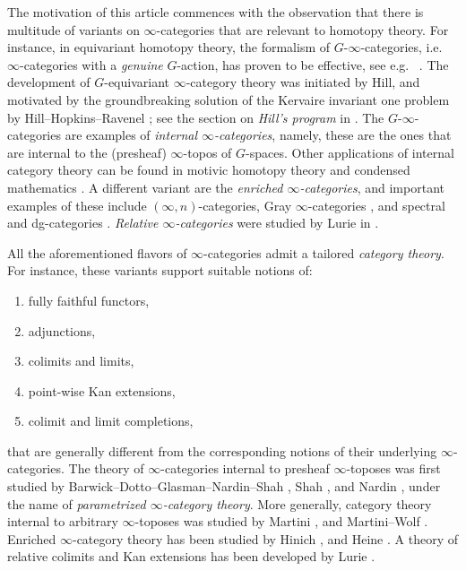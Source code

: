 \documentclass[a4paper, 11pt]{amsart}
\numberwithin{theorem}{section}
\theoremstyle{definition}
\begin{document}
The motivation of this article commences with the observation that there is multitude of variants on $\infty$-categories that are relevant to homotopy theory. 
For instance, in equivariant homotopy theory, the formalism of $G$-$\infty$-categories, i.e.\ $\infty$-categories with a \textit{genuine} $G$-action, 
has proven to be effective, see e.g.\ \cite{EquivThom} \cite{Hilman}. The development of 
$G$-equivariant $\infty$-category theory was initiated by Hill, and motivated by the groundbreaking solution of the Kervaire invariant one problem by Hill--Hopkins--Ravenel \cite{HHR}; see the section on \textit{Hill's program} in \cite{Expose0}.
The $G$-$\infty$-categories are examples of \textit{internal $\infty$-categories}, namely, these are the ones that are internal 
to the (presheaf) $\infty$-topos of $G$-spaces. Other applications of 
internal category theory can be found in motivic homotopy theory \cite{BachmannElmantoHeller} 
and condensed mathematics \cite{BarwickGlasmanHaine} \cite{Wolf}. 
A different variant are the \textit{enriched  $\infty$-categories}, 
and important examples of these include $(\infty,n)$-categories, Gray $\infty$-categories \cite{HeineCatHom}, and spectral and dg-categories \cite[Example 5.11]{HaugsengRect}.
\textit{Relative $\infty$-categories} were studied by Lurie in \cite[Section 4.3.1]{HTT}.

All the aforementioned flavors of $\infty$-categories admit a tailored \textit{category theory}. For instance, these variants support suitable notions of:
\begin{enumerate}
	\item fully faithful functors,
	\item adjunctions,
	\item colimits and limits,
	\item point-wise Kan extensions,
	\item colimit and limit completions,
\end{enumerate}
that are generally different from the corresponding notions of their underlying $\infty$-cate\-gories. The theory of $\infty$-categories internal to presheaf $\infty$-toposes 
was first studied by Barwick--Dotto--Glasman--Nardin--Shah \cite{ExposeI}, Shah \cite{Shah}, and Nardin \cite{Nardin}, under the name of \textit{parametrized 
$\infty$-category theory}.
More generally, category theory internal to arbitrary $\infty$-toposes was studied  by Martini \cite{Martini}, and Martini--Wolf \cite{MartiniWolf}. 
Enriched $\infty$-category theory has been studied by Hinich \cite{Hinich}, and Heine \cite{Heine}. A theory of relative colimits and Kan extensions has been developed by Lurie \cite{HTT}.
\end{document}
